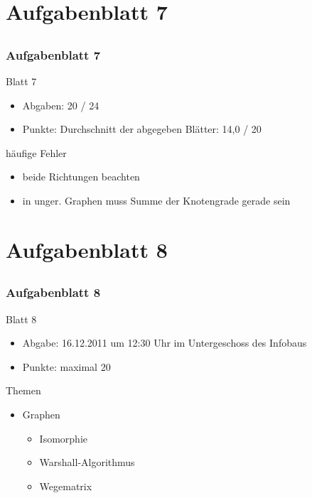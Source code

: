 \section[Rückblick]{Aufgabenblatt 7}
\subsection*{}
\begin{frame}
	\frametitle{Aufgabenblatt 7}
	\begin{block}{Blatt 7}
		\begin{itemize}
			\item Abgaben: 20 / 24
			\item Punkte: Durchschnitt der abgegeben Blätter: 14,0 / 20
		\end{itemize}
   \end{block}
	\begin{block}{häufige Fehler}
 		\begin{itemize}
 	  		\item[7.1] beide Richtungen beachten \pause
 	  		\item[7.4 b)] in unger. Graphen muss Summe der Knotengrade gerade sein
 	  \end{itemize}
	\end{block}
\end{frame}

\section[Blatt 8]{Aufgabenblatt 8}
\subsection*{}
\begin{frame}
	\frametitle{Aufgabenblatt 8}
	\begin{block}{Blatt 8}
		\begin{itemize}
			\item Abgabe: 16.12.2011 um 12:30 Uhr im Untergeschoss des Infobaus
			\item Punkte: maximal 20
		\end{itemize}
  	\end{block}
	\begin{block}{Themen}
		\begin{itemize}
	  		\item Graphen
				\begin{itemize}
					\item Isomorphie
					\item Warshall-Algorithmus
					\item Wegematrix
				\end{itemize}
	 	\end{itemize}
	\end{block}
\end{frame}
